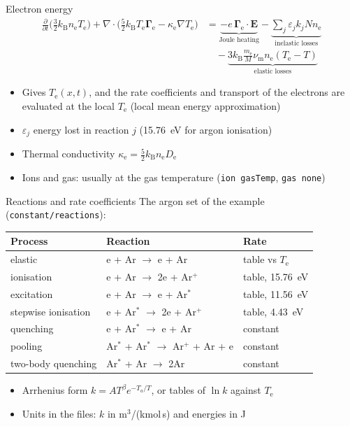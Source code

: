 \documentclass[aspectratio=169,11pt]{beamer}
\newcommand{\kw}[1]{\texttt{#1}}
\newcommand{\Te}{T_\mathrm{e}}
\newcommand{\nel}{n_\mathrm{e}}
\begin{document}
\begin{frame}{Electron energy}
  \begin{align*}
    \frac{\partial}{\partial t}\Big(\tfrac32 k_\mathrm{B}\nel\Te\Big)
    + \nabla\cdot\Big(\tfrac52 k_\mathrm{B}\Te\boldsymbol{\Gamma}_\mathrm{e}
    - \kappa_\mathrm{e}\nabla\Te\Big)
    &= \underbrace{-e\,\boldsymbol{\Gamma}_\mathrm{e}\cdot\mathbf{E}}_{\text{Joule heating}}
    - \underbrace{\textstyle\sum_j \varepsilon_j k_j N\nel}_{\text{inelastic losses}} \\
    &\quad - \underbrace{3k_\mathrm{B}\tfrac{m_\mathrm{e}}{M}\nu_\mathrm{m}\nel(\Te-T)}_{\text{elastic losses}}
  \end{align*}
  \begin{itemize}
    \item Gives $\Te(x,t)$, and the rate coefficients and transport of the electrons
          are evaluated at the local $\Te$ (local mean energy approximation)
    \item $\varepsilon_j$ energy lost in reaction $j$ (15.76~eV for argon ionisation)
    \item Thermal conductivity $\kappa_\mathrm{e}=\tfrac52 k_\mathrm{B}\nel D_\mathrm{e}$
    \item Ions and gas: usually at the gas temperature (\kw{ion gasTemp}, \kw{gas none})
  \end{itemize}
\end{frame}

\begin{frame}{Reactions and rate coefficients}
  The argon set of the example (\kw{constant/reactions}):
  \begin{center}\small
  \begin{tabular}{lll}
    \toprule
    Process & Reaction & Rate \\
    \midrule
    elastic & e + Ar $\to$ e + Ar & table vs $\Te$ \\
    ionisation & e + Ar $\to$ 2e + Ar$^+$ & table, 15.76~eV \\
    excitation & e + Ar $\to$ e + Ar$^*$ & table, 11.56~eV \\
    stepwise ionisation & e + Ar$^*$ $\to$ 2e + Ar$^+$ & table, 4.43~eV \\
    quenching & e + Ar$^*$ $\to$ e + Ar & constant \\
    pooling & Ar$^*$ + Ar$^*$ $\to$ Ar$^+$ + Ar + e & constant \\
    two-body quenching & Ar$^*$ + Ar $\to$ 2Ar & constant \\
    \bottomrule
  \end{tabular}
  \end{center}
  \begin{itemize}\small
    \item Arrhenius form $k=AT^\beta e^{-T_a/T}$, or tables of $\ln k$ against $\Te$
    \item Units in the files: $k$ in m$^3$/(kmol\,s) and energies in J
  \end{itemize}
\end{frame}
\end{document}
